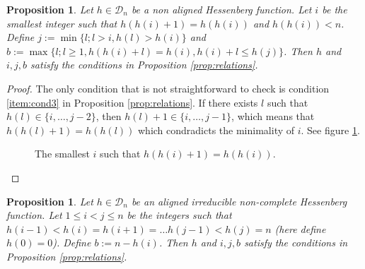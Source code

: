 \documentclass[10pt]{amsart}
\newtheorem{Prop}[Lem]{Proposition}
\theoremstyle{definition}
\newcommand{\D}{\mathcal{D}}
\newcommand{\dyckpath}[2]{
\draw[line width=2pt] (#1) foreach \dir in {#2}{ -- ++(\dir*90:1)};
}
\newcommand{\dyckpathc}[3]{
\draw[line width=2pt, color=#3] (#1) foreach \dir in {#2}{ -- ++(\dir*90:1)};
}
\newcommand{\gline}[4]{
\draw[line width=#4 pt, color=#3] (#1) -- (#2);
}
\begin{document}
\begin{Prop}
\label{prop:ijk1}
Let $h\in \D_n$ be a non aligned Hessenberg function. Let $i$ be the smallest integer such that $h(h(i)+1)=h(h(i))$ and $h(h(i))<n$. Define $j:=\min\{l; l>i, h(l)>h(i)\}$ and $b:=\max\{l;l\geq 1, h(h(i)+l)=h(i), h(i)+l\leq h(j)\}$. Then $h$ and $i,j,b$ satisfy the conditions in Proposition \ref{prop:relations}.
\end{Prop}
\begin{proof}
The only condition that is not straightforward to check is condition \eqref{item:cond3} in Proposition \ref{prop:relations}. If there exists $l$ such that $h(l)\in \{i,\ldots, j-2\}$, then $h(l)+1\in \{i,\ldots, j-1\}$, which means that $h(h(l)+1)=h(h(l))$ which condradicts the minimality of $i$. See figure \ref{fig:condnalig}.
\begin{figure}[htb]  \centering
{}
\caption{The smallest $i$ such that $h(h(i)+1)=h(h(i))$.}
\label{fig:condnalig}
\end{figure}



\end{proof}
\begin{Prop}
\label{prop:ijk2}
Let $h\in \D_n$ be an aligned irreducible non-complete Hessenberg function. Let $1\leq i< j\leq n$ be the integers such that $h(i-1)<h(i)=h(i+1)=\ldots h(j-1)<h(j)=n$ (here define $h(0)=0$). Define $b:=n-h(i)$. Then $h$ and $i,j,b$ satisfy the conditions in Proposition \ref{prop:relations}.
\end{Prop}
\end{document}
